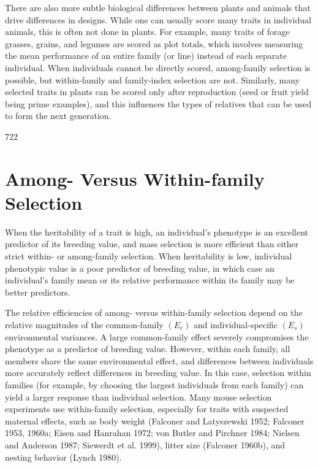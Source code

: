 \documentclass{article}
\begin{document}
There are also more subtle biological differences between plants and animals that drive differences in designs. While one can usually score many traits in individual animals, this is often not done in plants. For example, many traits of forage grasses, grains, and legumes are scored as  $ \text{plot totals} $, which involves measuring the mean performance of an entire family (or line) instead of each separate individual. When individuals cannot be directly scored, among-family selection is possible, but within-family and family-index selection are not. Similarly, many selected traits in plants can be scored only after reproduction (seed or fruit yield being prime examples), and this influences the types of relatives that can be used to form the next generation.

722

\section{Among- Versus Within-family Selection}
When the heritability of a trait is high, an individual's phenotype is an excellent predictor of its breeding value, and mass selection is more efficient than either strict within- or among-family selection. When heritability is low, individual phenotypic value is a poor predictor of breeding value, in which case an individual's family mean or its relative performance within its family may be better predictors.

The relative efficiencies of among- versus within-family selection depend on the relative magnitudes of the common-family  $ (E_{c}) $ and individual-specific  $ (E_{s}) $ environmental variances. A large common-family effect severely compromises the phenotype as a predictor of breeding value. However, within each family, all members share the same environmental effect, and differences between individuals more accurately reflect differences in breeding value. In this case, selection within families (for example, by choosing the largest individuals from each family) can yield a larger response than individual selection. Many mouse selection experiments use within-family selection, especially for traits with suspected maternal effects, such as body weight (Falconer and Latyszewski 1952; Falconer 1953, 1960a; Eisen and Hanrahan 1972; von Butler and Pirchner 1984; Nielsen and Anderson 1987; Siewerdt et al. 1999), litter size (Falconer 1960b), and nesting behavior (Lynch 1980).
\end{document}
